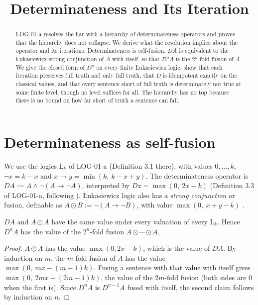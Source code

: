 \documentclass{situationist-preprint}
\title{Determinateness and Its Iteration}
\begin{document}
\maketitle

\begin{abstract}
LOG-01-a resolves the liar with a hierarchy of determinateness operators and proves that the hierarchy does not collapse. We derive what the resolution implies about the operator and its iterations. Determinateness is self-fusion: $DA$ is equivalent to the Łukasiewicz strong conjunction of $A$ with itself, so that $D^n A$ is the $2^n$-fold fusion of $A$. We give the closed form of $D^n$ on every finite Łukasiewicz logic, show that each iteration preserves full truth and only full truth, that $D$ is idempotent exactly on the classical values, and that every sentence short of full truth is determinately not true at some finite level, though no level suffices for all. The hierarchy has no top because there is no bound on how far short of truth a sentence can fall.
\end{abstract}

\section{Determinateness as self-fusion}

We use the logics $\mathrm{L}_k$ of LOG-01-a (Definition 3.1 there), with values $0, \ldots, k$, $\neg x = k - x$ and $x \to y = \min(k,\ k - x + y)$. The determinateness operator is $DA := A \wedge \neg(A \to \neg A)$, interpreted by $Dx = \max(0,\ 2x - k)$ (Definition 3.3 of LOG-01-a, following \citealp{Field2003}). Łukasiewicz logic also has a \emph{strong conjunction} or fusion, definable as $A \odot B := \neg(A \to \neg B)$, with value $\max(0,\ x + y - k)$ \citep{Hajek1998}.

\begin{proposition}\label{p:fusion}
$DA$ and $A \odot A$ have the same value under every valuation of every $\mathrm{L}_k$. Hence $D^n A$ has the value of the $2^n$-fold fusion $A \odot \cdots \odot A$.
\end{proposition}

\begin{proof}
$A \odot A$ has the value $\max(0, 2x - k)$, which is the value of $DA$. By induction on $m$, the $m$-fold fusion of $A$ has the value $\max(0,\ mx - (m-1)k)$. Fusing a sentence with that value with itself gives $\max(0,\ 2mx - (2m-1)k)$, the value of the $2m$-fold fusion (both sides are $0$ when the first is). Since $D^n A$ is $D^{n-1}A$ fused with itself, the second claim follows by induction on $n$.
\end{proof}
\end{document}
